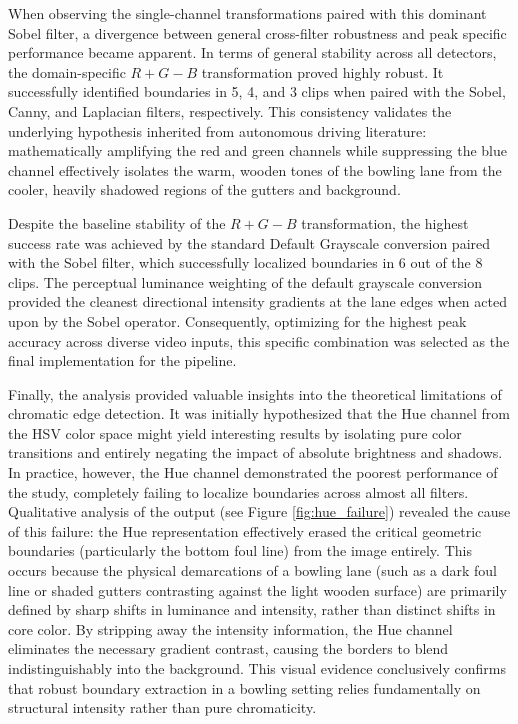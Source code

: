 When observing the single-channel transformations paired with this dominant Sobel filter, a divergence between general cross-filter robustness and peak specific performance became apparent. In terms of general stability across all detectors, the domain-specific $R+G-B$ transformation proved highly robust. It successfully identified boundaries in 5, 4, and 3 clips when paired with the Sobel, Canny, and Laplacian filters, respectively. This consistency validates the underlying hypothesis inherited from autonomous driving literature: mathematically amplifying the red and green channels while suppressing the blue channel effectively isolates the warm, wooden tones of the bowling lane from the cooler, heavily shadowed regions of the gutters and background.

Despite the baseline stability of the $R+G-B$ transformation, the highest success rate was achieved by the standard Default Grayscale conversion paired with the Sobel filter, which successfully localized boundaries in 6 out of the 8 clips. The perceptual luminance weighting of the default grayscale conversion provided the cleanest directional intensity gradients at the lane edges when acted upon by the Sobel operator. Consequently, optimizing for the highest peak accuracy across diverse video inputs, this specific combination was selected as the final implementation for the pipeline.

Finally, the analysis provided valuable insights into the theoretical limitations of chromatic edge detection. It was initially hypothesized that the Hue channel from the HSV color space might yield interesting results by isolating pure color transitions and entirely negating the impact of absolute brightness and shadows. In practice, however, the Hue channel demonstrated the poorest performance of the study, completely failing to localize boundaries across almost all filters. Qualitative analysis of the output (see Figure \ref{fig:hue_failure}) revealed the cause of this failure: the Hue representation effectively erased the critical geometric boundaries (particularly the bottom foul line) from the image entirely. This occurs because the physical demarcations of a bowling lane (such as a dark foul line or shaded gutters contrasting against the light wooden surface) are primarily defined by sharp shifts in luminance and intensity, rather than distinct shifts in core color. By stripping away the intensity information, the Hue channel eliminates the necessary gradient contrast, causing the borders to blend indistinguishably into the background. This visual evidence conclusively confirms that robust boundary extraction in a bowling setting relies fundamentally on structural intensity rather than pure chromaticity.

